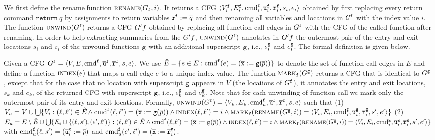 We first define the rename function $\textsc{rename}(G_{\mathtt{{f}}},i)$. It returns a CFG $\langle V_i^{\mathtt{{f}}}, E_i^{\mathtt{{f}}},\textmd{cmd}_i^{\mathtt{{f}}}, \overline{\texttt{u}}_i^{\mathtt{{f}}}, \overline{\texttt{r}}_i^{\mathtt{{f}}},s_i,e_i \rangle$ obtained by first replacing every return command $\mathtt{return}\ \overline{q}$ by assignments to return variables $\overline{\texttt{r}}^{\mathtt{{f}}} := \overline{q}$ and then renaming all variables and locations in $G^{\mathtt{{f}}}$ with the index value $i$. The function $\textsc{unwind}(G^{\mathtt{{f}}})$ returns a CFG $G'^\fun{f}$ obtained by replacing all function call edges in $G^{\mathtt{{f}}}$ with the CFG of the called function after renaming. In order to help extracting summaries from the $G'^\fun{f}$, $\textsc{unwind}(G^{\mathtt{{f}}})$ annotates in $G'^\fun{f}$ the outermost pair of the entry and exit locations ${s_i}$ and ${e_i}$ of the unwound functions $\mathtt{{g}}$ with an additional superscript $\mathtt{{g}}$, i.e., $s_i^{\mathtt{{g}}}$ and $e_i^{\mathtt{{g}}}$. The formal definition is given below.

Given a CFG $G^{\mathtt{{f}}}=\langle
V, E,\textmd{cmd}^{\mathtt{{f}}}, \overline{\texttt{u}}^{\mathtt{{f}}}, \overline{\texttt{r}}^{\mathtt{{f}}},s,e \rangle$.
We use $\hat{E} =\{e\in E: \textmd{cmd}^{\mathtt{{f}}} (e)= (\overline{\texttt{x}}:=\mathtt{g}(\overline{p}))\}$ to denote the set of function call edges in $E$ and define a function $\textsc{index}(e)$ that maps a call edge $e$ to a unique index value.
The function $\textsc{mark}_{\mathtt{{f}}}(G^{\mathtt{{g}}})$ returns a CFG that is identical to $G^{\mathtt{{g}}}$, except that for the case that no location with superscript $\mathtt{{g}}$ appears in $V$ (the locations of $G^{\mathtt{{f}}}$), it annotates the entry and exit locations, $s_k$ and $e_k$, of the returned CFG with superscript $\mathtt{{g}}$, i.e., $s_k^{\mathtt{{g}}}$ and $e_k^{\mathtt{{g}}}$. Note that for each unwinding of function call we mark only the outermost pair of its entry and exit locations.
Formally, $\textsc{unwind}(G^{\mathtt{{f}}}) = \langle V_u, E_u,\textmd{cmd}_u^{\mathtt{{f}}}, \overline{\texttt{u}}^{\mathtt{{f}}}, \overline{\texttt{r}}^{\mathtt{{f}}},s,e \rangle$ such that 
(1) $V_u = V\cup \bigcup\{V_i:(\ell, \ell')\in \hat{E} \wedge \textmd{cmd}^{\mathtt{{f}}}(\ell, \ell')=(\overline{\texttt{x}}:=\mathtt{g}(\overline{p}))\wedge \textsc{index}(\ell, \ell')=i \wedge 
\textsc{mark}_{\mathtt{{f}}}(\textsc{rename}(G^{\mathtt{{g}}},i))=
\langle V_i, E_i,\textmd{cmd}^{\mathtt{{g}}}_i, \overline{\texttt{u}}^{\mathtt{{g}}}_i, \overline{\texttt{r}}^{\mathtt{{g}}}_i,s',e'\rangle \}$ 
(2) $E_u= E \setminus \hat{E} \cup \bigcup\{E_i\cup\{(\ell, s'),(e', \ell')\}: (\ell, \ell')\in \hat{E} \wedge 
\textmd{cmd}^{\mathtt{{f}}}(\ell, \ell')=(\overline{\texttt{x}}:=\mathtt{g}(\overline{p}))\wedge \textsc{index}(\ell, \ell')=i \wedge 
\textsc{mark}_{\mathtt{{f}}}(\textsc{rename}(G^{\mathtt{{g}}},i))=
\langle V_i, E_i,\textmd{cmd}^{\mathtt{{g}}}_i, \overline{\texttt{u}}^{\mathtt{{g}}}_i, \overline{\texttt{r}}^{\mathtt{{g}}}_i,s',e'\rangle \}$ with $\textmd{cmd}_u^{\mathtt{{f}}} (\ell, s') = (\overline{\texttt{u}}_i^{\mathtt{{g}}}:=\overline{p})$ and $\textmd{cmd}_u^{\mathtt{{f}}} (e', \ell') = (\overline{\texttt{x}}:=\overline{\texttt{r}}^{\mathtt{{g}}}_i)$.


